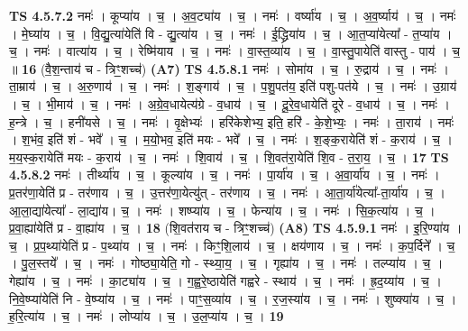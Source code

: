 \documentclass[17pt]{extarticle}
\begin{document}
                  \newline
                                \textbf{ TS 4.5.7.2} \newline
                  नमः॑ । कूप्या॑य । च॒ । अ॒व॒ट्या॑य । च॒ । नमः॑ । वर्ष्या॑य । च॒ । अ॒व॒र्ष्याय॑ । च॒ । नमः॑ । मे॒घ्या॑य । च॒ । वि॒द्यु॒त्या॑येति॑ वि - द्यु॒त्या॑य । च॒ । नमः॑ । ई॒द्ध्रिया॑य । च॒ । आ॒त॒प्या॑येत्या᳚ - त॒प्या॑य । च॒ । नमः॑ । वात्या॑य । च॒ । रेष्मि॑याय । च॒ । नमः॑ । वा॒स्त॒व्या॑य । च॒ । वा॒स्तु॒पायेति॑ वास्तु - पाय॑ । च॒ ॥ \textbf{  16} \newline
                  \newline
                      (वै॒श॒न्ताय॑ च - त्रिꣳ॒॒शच्च॑)  \textbf{(A7)} \newline \newline
                                \textbf{ TS 4.5.8.1} \newline
                  नमः॑ । सोमा॑य । च॒ । रु॒द्राय॑ । च॒ । नमः॑ । ता॒म्राय॑ । च॒ । अ॒रु॒णाय॑ । च॒ । नमः॑ । श॒ङ्गाय॑ । च॒ । प॒शु॒पत॑य॒ इति॑ पशु-पत॑ये । च॒ । नमः॑ । उ॒ग्राय॑ । च॒ । भी॒माय॑ । च॒ । नमः॑ । अ॒ग्रे॒व॒धायेत्य॑ग्रे - व॒धाय॑ । च॒ । दू॒रे॒व॒धायेति॑ दूरे - व॒धाय॑ । च॒ । नमः॑ । ह॒न्त्रे । च॒ । हनी॑यसे । च॒ । नमः॑ । वृ॒क्षेभ्यः॑ । हरि॑केशेभ्य॒ इति॒ हरि॑ - के॒शे॒भ्यः॒ । नमः॑ । ता॒राय॑ । नमः॑ । श॒भंव॒ इति॑ शं - भवे᳚ । च॒ । म॒यो॒भव॒ इति॑ मयः - भवे᳚ । च॒ । नमः॑ । श॒ङ्क॒रायेति॑ शं - क॒राय॑ । च॒ । म॒य॒स्क॒रायेति॑ मयः - क॒राय॑ । च॒ । नमः॑ । शि॒वाय॑ । च॒ । शि॒वत॑रा॒येति॑ शि॒व - त॒रा॒य॒ । च॒ । \textbf{  17} \newline
                  \newline
                                \textbf{ TS 4.5.8.2} \newline
                  नमः॑ । तीर्थ्या॑य । च॒ । कूल्या॑य । च॒ । नमः॑ । पा॒र्या॑य । च॒ । अ॒वा॒र्या॑य । च॒ । नमः॑ । प्र॒तर॑णा॒येति॑ प्र - तर॑णाय । च॒ । उ॒त्तर॑णा॒येत्यु॑त् - तर॑णाय । च॒ । नमः॑ । आ॒ता॒र्या॑येत्या᳚-ता॒र्या॑य । च॒ । आ॒ला॒द्या॑येत्या᳚ - ला॒द्या॑य। च॒ । नमः॑ । शष्प्या॑य । च॒ । फेन्या॑य । च॒ । नमः॑ । सि॒क॒त्या॑य । च॒ । प्र॒वा॒ह्या॑येति॑ प्र - वा॒ह्या॑य । च॒ । \textbf{  18} \newline
                  \newline
                      (शि॒वत॑राय च - त्रिꣳ॒॒शच्च॑)  \textbf{(A8)} \newline \newline
                                \textbf{ TS 4.5.9.1} \newline
                  नमः॑ । इ॒रि॒ण्या॑य । च॒ । प्र॒प॒थ्या॑येति॑ प्र - प॒थ्या॑य । च॒ । नमः॑ । किꣳ॒॒शि॒लाय॑ । च॒ । क्षय॑णाय । च॒ । नमः॑ । क॒प॒र्दिने᳚ । च॒ । पु॒ल॒स्तये᳚ । च॒ । नमः॑ । गोष्ठ्या॒येति॒ गो - स्थ्या॒य॒ । च॒ । गृह्या॑य । च॒ । नमः॑ । तल्प्या॑य । च॒ । गेह्या॑य । च॒ । नमः॑ । का॒ट्या॑य । च॒ । ग॒ह्व॒रे॒ष्ठायेति॑ गह्वरे - स्थाय॑ । च॒ । नमः॑ । ह्र॒द॒य्या॑य । च॒ । नि॒वे॒ष्प्या॑येति॑ नि - वे॒ष्प्या॑य । च॒ । नमः॑ । पाꣳ॒॒स॒व्या॑य । च॒ । र॒ज॒स्या॑य । च॒ । नमः॑ । शुष्क्या॑य । च॒ । ह॒रि॒त्या॑य । च॒ । नमः॑ । लोप्या॑य । च॒ । उ॒ल॒प्या॑य । च॒ । \textbf{  19} \newline
\end{document}
